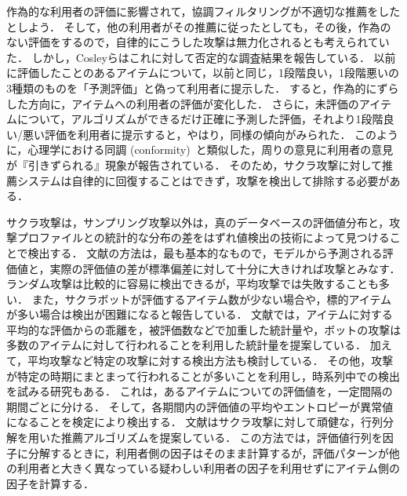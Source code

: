 作為的な利用者の評価に影響されて，協調フィルタリングが不適切な推薦をしたとしよう．
そして，他の利用者がその推薦に従ったとしても，その後，作為のない評価をするので，自律的にこうした攻撃は無力化されるとも考えられていた．
しかし，Cosleyら\cite{sigchi:03:02}はこれに対して否定的な調査結果を報告している．
以前に評価したことのあるアイテムについて，以前と同じ，1段階良い，1段階悪いの3種類のものを「予測評価」と偽って利用者に提示した．
すると，作為的にずらした方向に，アイテムへの利用者の評価が変化した．
さらに，未評価のアイテムについて，アルゴリズムができるだけ正確に予測した評価，それより1段階良い/悪い評価を利用者に提示すると，やはり，同様の傾向がみられた．
このように，心理学における同調 (conformity)~\cite{jb:026:00}と類似した，周りの意見に利用者の意見が『引きずられる』現象が報告されている．
そのため，サクラ攻撃に対して推薦システムは自律的に回復することはできず，攻撃を検出して排除する必要がある．

サクラ攻撃は，サンプリング攻撃以外は，真のデータベースの評価値分布と，攻撃プロファイルとの統計的な分布の差をはずれ値検出の技術によって見つけることで検出する．
文献\cite{sigir:06:01}の方法は，最も基本的なもので，モデルから予測される評価値と，実際の評価値の差が標準偏差に対して十分に大きければ攻撃とみなす．
ランダム攻撃は比較的に容易に検出できるが，平均攻撃では失敗することも多い．
また，サクラボットが評価するアイテム数が少ない場合や，標的アイテムが多い場合は検出が困難になると報告している．
文献\cite{kdd:06:01}では，アイテムに対する平均的な評価からの乖離を，被評価数などで加重した統計量や，ボットの攻撃は多数のアイテムに対して行われることを利用した統計量を提案している．
加えて，平均攻撃など特定の攻撃に対する検出方法も検討している．
その他，攻撃が特定の時期にまとまって行われることが多いことを利用し，時系列中での検出を試みる研究\cite{kdd:06:03}もある．
これは，あるアイテムについての評価値を，一定間隔の期間ごとに分ける．
そして，各期間内の評価値の平均やエントロピーが異常値になることを検定により検出する．
文献\cite{sigir:08:04}はサクラ攻撃に対して頑健な，行列分解を用いた推薦アルゴリズムを提案している．
この方法では，評価値行列を因子に分解するときに，利用者側の因子はそのまま計算するが，評価パターンが他の利用者と大きく異なっている疑わしい利用者の因子を利用せずにアイテム側の因子を計算する．
